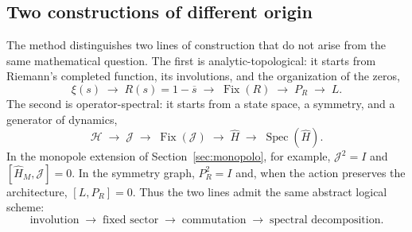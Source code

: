 \documentclass[11pt]{amsart}
\theoremstyle{definition}
\theoremstyle{remark}
\begin{document}
\subsection{Two constructions of different origin}
The method distinguishes two lines of construction that do not arise from the same mathematical question. The first is analytic-topological: it starts from Riemann's completed function, its involutions, and the organization of the zeros,
\begin{equation}\label{eq:lineaA}
 \xi(s)\;\longrightarrow\;R(s)=1-\overline{s}\;\longrightarrow\;
 \operatorname{Fix}(R)\;\longrightarrow\;P_R\;\longrightarrow\;L .
\end{equation}
The second is operator-spectral: it starts from a state space, a symmetry, and a generator of dynamics,
\begin{equation}\label{eq:lineaB}
 \mathcal H\;\longrightarrow\;\mathcal J\;\longrightarrow\;
 \operatorname{Fix}(\mathcal J)\;\longrightarrow\;\widehat H\;\longrightarrow\;
 \operatorname{Spec}(\widehat H).
\end{equation}
In the monopole extension of Section~\ref{sec:monopolo}, for example, $\mathcal J^2=I$ and $[\widehat H_M,\mathcal J]=0$. In the symmetry graph, $P_R^2=I$ and, when the action preserves the architecture, $[L,P_R]=0$. Thus the two lines admit the same abstract logical scheme:
\begin{equation}\label{eq:parallelpattern}
 \boxed{\text{involution}\;\to\;\text{fixed sector}\;\to\;\text{commutation}\;\to\;\text{spectral decomposition}.}
\end{equation}
\end{document}
